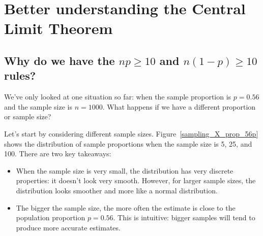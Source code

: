 

























\section{Better understanding the Central Limit Theorem}


\subsection{Why do we have the $np \geq 10$ and
    $n(1-p) \geq 10$ rules?}

We've only looked at one situation so far: when the sample
proportion is $p = 0.56$ and the sample size is $n = 1000$.
What happens if we have a different proportion or sample size?

Let's start by considering different sample sizes.
Figure~\ref{sampling_X_prop_56p} shows the distribution of sample
proportions when the sample size is 5, 25, and 100. There are
two key takeaways:
\begin{itemize}
\item When the sample size is very small, the distribution has
very discrete properties: it doesn't look very smooth. However,
for larger sample sizes, the distribution looks smoother and
more like a normal distribution.
\item The bigger the sample size, the more often the estimate is
close to the population proportion $p = 0.56$. This is intuitive:
bigger samples will tend to produce more accurate estimates.
\end{itemize}

